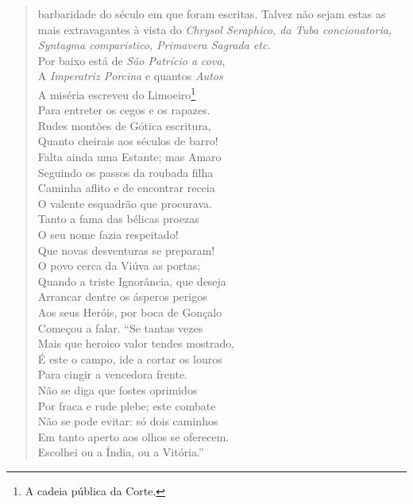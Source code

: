 \begin{verse}
{barbaridade do século em que foram escritas. Talvez não sejam estas as mais
extravagantes à vista do \textit{Chrysol Seraphico, da Tuba concionatoria,
Syntagma comparistico, Primavera Sagrada etc}.}\\
Por baixo está de \textit{São Patrício a cova},\\
A \textit{Imperatriz Porcina} e quantos \textit{Autos}\\
A miséria escreveu do Limoeiro\footnote{ A cadeia pública da Corte.}\\
Para entreter os cegos e os rapazes.\\
Rudes montões de Gótica escritura,\\		\index{\Gotic}
Quanto cheirais aos séculos de barro!\\
Falta ainda uma Estante; mas Amaro\\
Seguindo os passos da roubada filha\\
Caminha aflito e de encontrar receia\\
O valente esquadrão que procurava.\\
Tanto a fama das bélicas proezas\\
O seu nome fazia respeitado! \\[10pt]


Que novas desventuras se preparam!\\
O povo cerca da Viúva as portas;\\
Quando a triste Ignorância, que deseja\\			\index{\Ignor}
Arrancar dentre os ásperos perigos\\
Aos seus Heróis, por boca de Gonçalo\\
Começou a falar. ``Se tantas vezes\\
Mais que heroico valor tendes mostrado,\\		\index{\Heroic}
É este o campo, ide a cortar os louros\\		\index{\Lour}
Para cingir a vencedora frente.\\
Não se diga que fostes oprimidos\\
Por fraca e rude plebe; este combate\\
Não se pode evitar: só dois caminhos\\
Em tanto aperto aos olhos se oferecem.\\
Escolhei ou a Índia, ou a Vitória.'' \\[10pt]



\end{verse}
